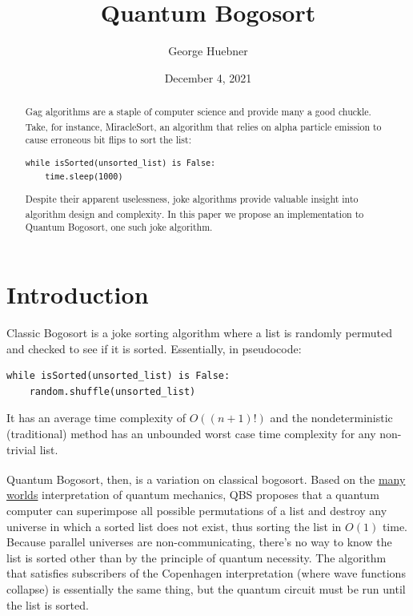 \documentclass[12pt]{article}
\title{Quantum Bogosort}
\author{George Huebner}
\date{December 4, 2021}
\begin{document}
\maketitle

\begin{abstract}
Gag algorithms are a staple of computer science and provide many a good chuckle. Take, for instance, MiracleSort\textsuperscript{\cite{thompson_2013}}, an algorithm that relies on alpha particle emission to cause erroneous bit flips to sort the list:
\begin{verbatim}
while isSorted(unsorted_list) is False:
    time.sleep(1000)
\end{verbatim}
Despite their apparent uselessness, joke algorithms provide valuable insight into algorithm design and complexity\textsuperscript{\cite{gruber_holzer_ruepp_2007}}. In this paper we propose an implementation to Quantum Bogosort, one such joke algorithm.
\end{abstract}

\section{Introduction}

Classic Bogosort is a joke sorting algorithm where a list is randomly permuted and checked to see if it is sorted. Essentially, in pseudocode:

\begin{verbatim}
while isSorted(unsorted_list) is False:
    random.shuffle(unsorted_list)
\end{verbatim}

It has an average time complexity of $ O((n+1)!) $ and the nondeterministic (traditional) method has an unbounded worst case time complexity for any non-trivial list.

Quantum Bogosort\textsuperscript{\cite{ryder_2018}}, then, is a variation on classical bogosort. Based on the \href{https://www.pbs.org/wgbh/nova/manyworlds/pdf/dissertation.pdf}{many worlds} interpretation of quantum mechanics, QBS proposes that a quantum computer can superimpose all possible permutations of a list and destroy any universe in which a sorted list does not exist, thus sorting the list in $ O(1) $ time. Because parallel universes are non-communicating, there's no way to know the list is sorted other than by the principle of quantum necessity. The algorithm that satisfies subscribers of the Copenhagen interpretation (where wave functions collapse) is essentially the same thing, but the quantum circuit must be run until the list is sorted.
\end{document}
